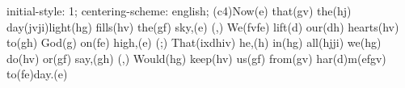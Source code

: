 initial-style: 1;
centering-scheme: english;
(c4)Now(e) that(gv) the(hj) day(jvji)light(hg) fills(hv) the(gf) sky,(e) (,)
We(fvfe) lift(d) our(dh) hearts(hv) to(gh) God(g) on(fe) high,(e) (;)
That(ixdhiv) he,(h) in(hg) all(hjji) we(hg) do(hv) or(gf) say,(gh) (,)
Would(hg) keep(hv) us(gf) from(gv) har(d)m(efgv) to(fe)day.(e)
